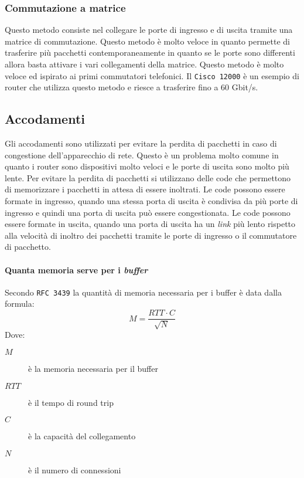         \subsubsection{Commutazione a matrice}
            Questo metodo consiste nel collegare le porte di ingresso e di uscita tramite una matrice di commutazione. Questo metodo è molto veloce in quanto permette di trasferire più pacchetti contemporaneamente in quanto se le porte sono differenti allora basta attivare i vari collegamenti della matrice. Questo metodo è molto veloce ed ispirato ai primi commutatori telefonici. Il \texttt{Cisco 12000} è un esempio di router che utilizza questo metodo e riesce a trasferire fino a 60 Gbit/s.
    \subsection{Accodamenti}
        Gli accodamenti sono utilizzati per evitare la perdita di pacchetti in caso di congestione dell'apparecchio di rete. Questo è un problema molto comune in quanto i router sono dispositivi molto veloci e le porte di uscita sono molto più lente. Per evitare la perdita di pacchetti si utilizzano delle code che permettono di memorizzare i pacchetti in attesa di essere inoltrati.
        Le code possono essere formate in ingresso, quando una stessa porta di uscita è condivisa da più porte di ingresso e quindi una porta di uscita può essere congestionata. Le code possono essere formate in uscita, quando una porta di uscita ha un \textit{link} più lento rispetto alla velocità di inoltro dei pacchetti tramite le porte di ingresso o il commutatore di pacchetto.
        \paragraph{Quanta memoria serve per i \textit{buffer}} Secondo \texttt{RFC 3439} la quantità di memoria necessaria per i buffer è data dalla formula: \[M = \frac{RTT \cdot C}{\sqrt{N}}\] Dove: \begin{description}
            \item[$M$] è la memoria necessaria per il buffer
            \item[$RTT$] è il tempo di round trip
            \item[$C$] è la capacità del collegamento
            \item[$N$] è il numero di connessioni
        \end{description}
